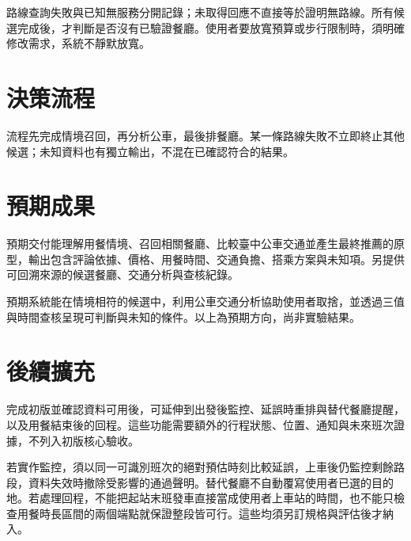

路線查詢失敗與已知無服務分開記錄；未取得回應不直接等於證明無路線。所有候選完成後，才判斷是否沒有已驗證餐廳。使用者要放寬預算或步行限制時，須明確修改需求，系統不靜默放寬。

\section{決策流程}
\label{sec:flow}




流程先完成情境召回，再分析公車，最後排餐廳。某一條路線失敗不立即終止其他候選；未知資料也有獨立輸出，不混在已確認符合的結果。

\section{預期成果}
\label{sec:expected}

預期交付能理解用餐情境、召回相關餐廳、比較臺中公車交通並產生最終推薦的原型，輸出包含評論依據、價格、用餐時間、交通負擔、搭乘方案與未知項。另提供可回溯來源的候選餐廳、交通分析與查核紀錄。

預期系統能在情境相符的候選中，利用公車交通分析協助使用者取捨，並透過三值與時間查核呈現可判斷與未知的條件。以上為預期方向，尚非實驗結果。

\section{後續擴充}
\label{sec:extensions}

完成初版並確認資料可用後，可延伸到出發後監控、延誤時重排與替代餐廳提醒，以及用餐結束後的回程。這些功能需要額外的行程狀態、位置、通知與未來班次證據，不列入初版核心驗收。

若實作監控，須以同一可識別班次的絕對預估時刻比較延誤，上車後仍監控剩餘路段，資料失效時撤除受影響的通過聲明。替代餐廳不自動覆寫使用者已選的目的地。若處理回程，不能把起站末班發車直接當成使用者上車站的時間，也不能只檢查用餐時長區間的兩個端點就保證整段皆可行。這些均須另訂規格與評估後才納入。
